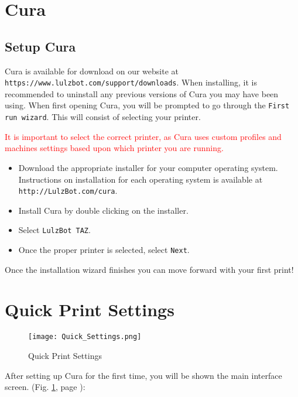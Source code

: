 %
%
%
%
%

\section{Cura}
\label{Cura}

\subsection{Setup Cura}
Cura is available for download on our website at \texttt{https://www.lulzbot.com/support/downloads}. When installing, it is recommended to uninstall any previous versions of Cura you may have been using. 
When first opening Cura, you will be prompted to go through the \texttt{First run wizard}. This will consist of selecting your printer.

\textcolor{red}{It is important to select the correct printer, as Cura uses custom profiles and machines settings based upon which printer you are running.}

\begin{itemize}
\item Download the appropriate installer for your computer operating system. Instructions on installation for each operating system is available at \texttt{http://LulzBot.com/cura}.
\item Install Cura by double clicking on the installer.
\item Select \texttt{LulzBot TAZ}.  
\item Once the proper printer is selected, select \texttt{Next}. 
\end{itemize}

Once the installation wizard finishes you can move forward with your first print!


\section{Quick Print Settings}
\begin{figure}[H]
\centering
\texttt{[image: Quick\_Settings.png]}
\caption{Quick Print Settings}
\label{fig:Cura}
\end{figure} 
After setting up Cura for the first time, you will be shown the main interface screen. (Fig. \ref{fig:Cura}, page \pageref{fig:Cura}): 

